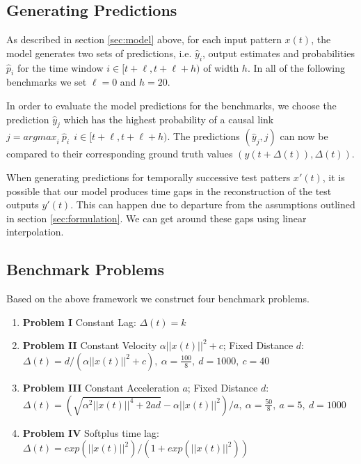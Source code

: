 \documentclass[envcountsect,runningheads]{llncs}
\theoremstyle{etoile}
\begin{document}
\subsection{Generating Predictions}

As described in section \ref{sec:model} above, for each input pattern $x(t)$, the model 
generates two sets of predictions, i.e. ${\hat{y}_i}$, output estimates and probabilities $\hat{p}_i$ 
for the time window $i \in [t+\ell, t+\ell+h)$ of width $h$. In all of the following benchmarks we set 
$\ell = 0$ and $h = 20$.

In order to evaluate the model predictions for the benchmarks, we choose the prediction $\hat{y}_j$ 
which has the highest probability of a causal link $j = {argmax}_{i} \ \hat{p}_i \ \ i \in [t+\ell, t+\ell+h)$. 
The predictions $(\hat{y}_j, j)$ can now be compared to their corresponding ground truth values 
$(y(t + \Delta(t)), \Delta(t))$. 

When generating predictions for temporally successive test patters $x'(t)$, it is possible that our 
model produces time gaps in the reconstruction of the test outputs $y'(t)$. This can happen due to 
departure from the assumptions outlined in section \ref{sec:formulation}. We can get around these 
gaps using linear interpolation.


\subsection{Benchmark Problems}\label{sec:benchmark}

Based on the above framework we construct four benchmark problems.

\begin{enumerate}
\item \textbf{Problem I} Constant Lag: \newline 
$\Delta(t) = k$

\item \textbf{Problem II} Constant Velocity $\alpha ||x(t)||^2 + c$; Fixed Distance $d$: 
\newline $\Delta(t) = d/(\alpha ||x(t)||^2 + c),\ \alpha = \frac{100}{8},\ d = 1000,\ c = 40$

\item \textbf{Problem III} Constant Acceleration $a$; Fixed Distance $d$: 
\newline $\Delta(t) = (\sqrt{\alpha^2||x(t)||^4 + 2ad} - \alpha||x(t)||^2)/a,\ \alpha = \frac{50}{8},\ a = 5,\ d = 1000$

\item \textbf{Problem IV} Softplus time lag: 
\newline $\Delta(t) = exp\left(||x(t)||^2\right)/\left(1 + exp(||x(t)||^2)\right)$

\end{enumerate}
\end{document}
